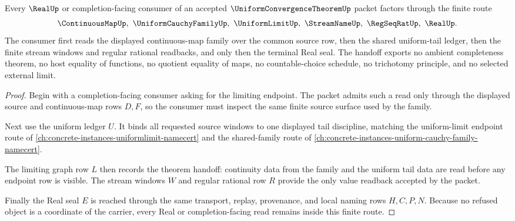 \begin{theorem}
\label{thm:uniform-convergence-theorem-real-completion-handoff}
Every $\RealUp$ or completion-facing consumer of an accepted $\UniformConvergenceTheoremUp$ packet factors through the finite route
$$
\ContinuousMapUp,\ \UniformCauchyFamilyUp,\ \UniformLimitUp,\ \StreamNameUp,\ \RegSeqRatUp,\ \RealUp .
$$
The consumer first reads the displayed continuous-map family over the common source row, then the shared uniform-tail ledger, then the finite stream windows and regular rational readbacks, and only then the terminal Real seal. The handoff exports no ambient completeness theorem, no host equality of functions, no quotient equality of maps, no countable-choice schedule, no trichotomy principle, and no selected external limit.
\end{theorem}
\begin{proof}
Begin with a completion-facing consumer asking for the limiting endpoint. The packet admits such a read only through the displayed source and continuous-map rows $D,F$, so the consumer must inspect the same finite source surface used by the family.

Next use the uniform ledger $U$. It binds all requested source windows to one displayed tail discipline, matching the uniform-limit endpoint route of \autoref{ch:concrete-instances-uniformlimit-namecert} and the shared-family route of \autoref{ch:concrete-instances-uniform-cauchy-family-namecert}.

The limiting graph row $L$ then records the theorem handoff: continuity data from the family and the uniform tail data are read before any endpoint row is visible. The stream windows $W$ and regular rational row $R$ provide the only value readback accepted by the packet.

Finally the Real seal $E$ is reached through the same transport, replay, provenance, and local naming rows $H,C,P,N$. Because no refused object is a coordinate of the carrier, every Real or completion-facing read remains inside this finite route.
\end{proof}


